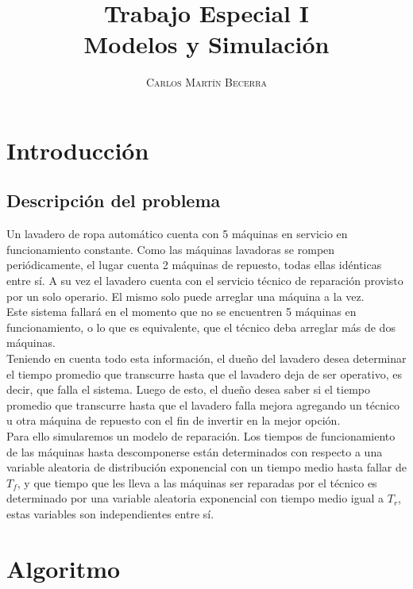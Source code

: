 \documentclass[10pt,a4paper]{article} %
\begin{document}
\title{\Huge \textbf{Trabajo Especial I} \\ 
        \huge Modelos y Simulaci\'on}
\author{\textsc{Carlos Mart\'in Becerra}}

    \maketitle
    
    \newpage
    \tableofcontents
    
    \newpage
    \section{Introducci\'on}
    \subsection{Descripci\'on del problema}
    Un lavadero de ropa autom\'atico cuenta con 5 m\'aquinas en servicio en funcionamiento constante. Como las m\'aquinas lavadoras se rompen peri\'odicamente, el lugar cuenta 2 m\'aquinas de repuesto, todas ellas id\'enticas entre s\'i. A su vez el lavadero cuenta con el servicio t\'ecnico de reparaci\'on provisto por un solo operario. El mismo solo puede arreglar una m\'aquina a la vez.\\
    Este sistema fallar\'a en el momento que no se encuentren 5 m\'aquinas en funcionamiento, o lo que es equivalente, que el t\'ecnico deba arreglar m\'as de dos m\'aquinas.\bigskip\\ 
    Teniendo en cuenta todo esta informaci\'on, el due\~no del lavadero desea determinar el tiempo promedio que transcurre hasta que el lavadero deja de ser operativo, es decir, que falla el sistema. Luego de esto, el due\~no desea saber si el tiempo promedio que transcurre hasta que el lavadero falla mejora agregando un t\'ecnico u otra m\'aquina de repuesto con el fin de invertir en la mejor opci\'on.\bigskip\\ 
    Para ello simularemos un modelo de reparaci\'on. Los tiempos de funcionamiento de las m\'aquinas hasta descomponerse est\'an determinados con respecto a una variable aleatoria de distribuci\'on exponencial con un tiempo medio hasta fallar de $T_f$, y que tiempo que les lleva a las m\'aquinas ser reparadas por el t\'ecnico es determinado por una variable aleatoria exponencial con tiempo medio igual a $T_r$, estas variables son independientes entre s\'i.
    
    \newpage
    \section{Algoritmo}
\end{document}
